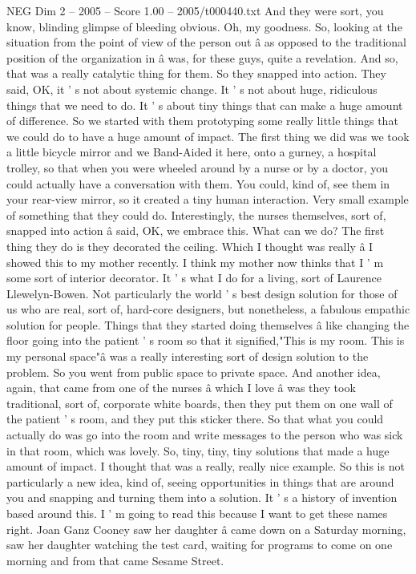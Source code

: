 \begin{textsample}{NEG Dim 2 – 2005 – Score 1.00 – 2005/t000440.txt}
And they were sort, you know, blinding glimpse of bleeding obvious.
Oh, my goodness.
So, looking at the situation from the point of view of the person out â as opposed to the traditional position of the organization in â was, for these guys, quite a revelation.
And so, that was a really catalytic thing for them.
So they snapped into action.
They said, OK, it ' s not about systemic change.
It ' s not about huge, ridiculous things that we need to do.
It ' s about tiny things that can make a huge amount of difference.
So we started with them prototyping some really little things that we could do to have a huge amount of impact.
The first thing we did was we took a little bicycle mirror and we Band-Aided it here, onto a gurney, a hospital trolley, so that when you were wheeled around by a nurse or by a doctor, you could actually have a conversation with them.
You could, kind of, see them in your rear-view mirror, so it created a tiny human interaction.
Very small example of something that they could do.
Interestingly, the nurses themselves, sort of, snapped into action â said, OK, we embrace this.
What can we do?
The first thing they do is they decorated the ceiling.
Which I thought was really â I showed this to my mother recently.
I think my mother now thinks that I ' m some sort of interior decorator.
It ' s what I do for a living, sort of Laurence Llewelyn-Bowen.
Not particularly the world ' s best design solution for those of us who are real, sort of, hard-core designers, but nonetheless, a fabulous empathic solution for people.
Things that they started doing themselves â like changing the floor going into the patient ' s room so that it signified,"This is my room.
This is my personal space"â was a really interesting sort of design solution to the problem.
So you went from public space to private space.
And another idea, again, that came from one of the nurses â which I love â was they took traditional, sort of, corporate white boards, then they put them on one wall of the patient ' s room, and they put this sticker there.
So that what you could actually do was go into the room and write messages to the person who was sick in that room, which was lovely.
So, tiny, tiny, tiny solutions that made a huge amount of impact.
I thought that was a really, really nice example.
So this is not particularly a new idea, kind of, seeing opportunities in things that are around you and snapping and turning them into a solution.
It ' s a history of invention based around this.
I ' m going to read this because I want to get these names right.
Joan Ganz Cooney saw her daughter â came down on a Saturday morning, saw her daughter watching the test card, waiting for programs to come on one morning and from that came Sesame Street.

\end{textsample}
